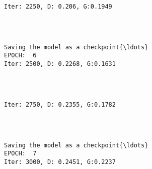 \documentclass[11pt]{article}
\begin{document}
    \begin{Verbatim}[commandchars=\\\{\}]

Iter: 2250, D: 0.206, G:0.1949
    \end{Verbatim}

    \begin{center}
    \end{center}
    { \hspace*{\fill} \\}
    
    \begin{Verbatim}[commandchars=\\\{\}]

Saving the model as a checkpoint{\ldots}
EPOCH:  6
Iter: 2500, D: 0.2268, G:0.1631
    \end{Verbatim}

    \begin{center}
    \end{center}
    { \hspace*{\fill} \\}
    
    \begin{Verbatim}[commandchars=\\\{\}]

Iter: 2750, D: 0.2355, G:0.1782
    \end{Verbatim}

    \begin{center}
    \end{center}
    { \hspace*{\fill} \\}
    
    \begin{Verbatim}[commandchars=\\\{\}]

Saving the model as a checkpoint{\ldots}
EPOCH:  7
Iter: 3000, D: 0.2451, G:0.2237
    \end{Verbatim}

    \begin{center}
    \end{center}
    { \hspace*{\fill} \\}
    
\end{document}
